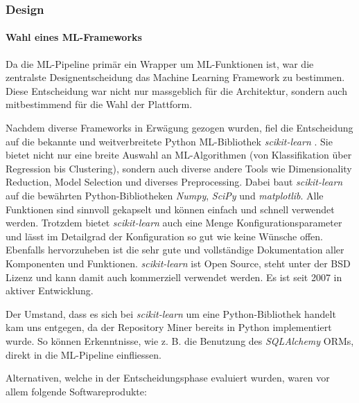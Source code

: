 \documentclass[10pt, a4paper]{article}
\begin{document}
\subsubsection{Design} \label{sec:mlpipeline_design}
\paragraph{Wahl eines ML-Frameworks}
Da die ML-Pipeline primär ein Wrapper um \ac{ML}-Funktionen ist, war die zentralste Designentscheidung das Machine Learning Framework zu bestimmen. Diese Entscheidung war nicht nur massgeblich für die Architektur, sondern auch mitbestimmend für die Wahl der Plattform.

Nachdem diverse Frameworks in Erwägung gezogen wurden, fiel die Entscheidung auf die bekannte und weitverbreitete Python ML-Bibliothek \emph{scikit-learn} \cite{sklearnhomepage, scikit-learn}. Sie bietet nicht nur eine breite Auswahl an ML-Algorithmen (von Klassifikation über Regression bis Clustering), sondern auch diverse andere Tools wie Dimensionality Reduction, Model Selection und diverses Preprocessing. Dabei baut \emph{scikit-learn} auf die bewährten Python-Bibliotheken \emph{Numpy}, \emph{SciPy} und \emph{matplotlib}. Alle Funktionen sind sinnvoll gekapselt und können einfach und schnell verwendet werden. Trotzdem bietet \emph{scikit-learn} auch eine Menge Konfigurationsparameter und lässt im Detailgrad der Konfiguration so gut wie keine Wünsche offen. Ebenfalls hervorzuheben ist die sehr gute und vollständige Dokumentation aller Komponenten und Funktionen.
\emph{scikit-learn} ist Open Source, steht unter der BSD Lizenz und kann damit auch kommerziell verwendet werden. Es ist seit 2007 in aktiver Entwicklung.

Der Umstand, dass es sich bei \emph{scikit-learn} um eine Python-Bibliothek handelt kam uns entgegen, da der Repository Miner bereits in Python implementiert wurde. So können Erkenntnisse, wie z. B. die Benutzung des \textit{SQLAlchemy} ORMs, direkt in die ML-Pipeline einfliessen.

Alternativen, welche in der Entscheidungsphase evaluiert wurden, waren vor allem folgende Softwareprodukte:
\end{document}
